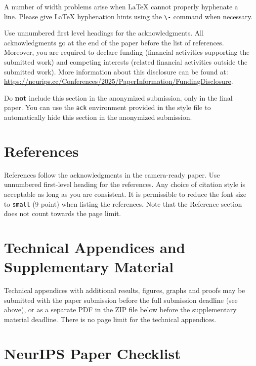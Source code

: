 \documentclass{article}
\begin{document}
A number of width problems arise when \LaTeX{} cannot properly hyphenate a
line. Please give LaTeX hyphenation hints using the \verb+\-+ command when
necessary.

\begin{ack}
Use unnumbered first level headings for the acknowledgments. All acknowledgments
go at the end of the paper before the list of references. Moreover, you are required to declare
funding (financial activities supporting the submitted work) and competing interests (related financial activities outside the submitted work).
More information about this disclosure can be found at: \url{https://neurips.cc/Conferences/2025/PaperInformation/FundingDisclosure}.


Do {\bf not} include this section in the anonymized submission, only in the final paper. You can use the \texttt{ack} environment provided in the style file to automatically hide this section in the anonymized submission.
\end{ack}

\section*{References}


References follow the acknowledgments in the camera-ready paper. Use unnumbered first-level heading for
the references. Any choice of citation style is acceptable as long as you are
consistent. It is permissible to reduce the font size to \verb+small+ (9 point)
when listing the references.
Note that the Reference section does not count towards the page limit.
\medskip


{
\small
}



\appendix

\section{Technical Appendices and Supplementary Material}
Technical appendices with additional results, figures, graphs and proofs may be submitted with the paper submission before the full submission deadline (see above), or as a separate PDF in the ZIP file below before the supplementary material deadline. There is no page limit for the technical appendices.


\newpage
\section*{NeurIPS Paper Checklist}
\end{document}
